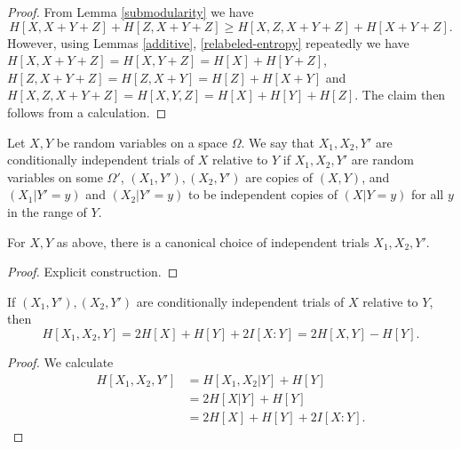 \begin{proof}
From Lemma \ref{submodularity} we have
$$ H[X, X+Y+Z] + H[Z, X+Y+Z] \geq H[X, Z, X+Y+Z] + H[X+Y+Z].$$
However, using Lemmas \ref{additive}, \ref{relabeled-entropy} repeatedly we have $H[X, X+Y+Z] = H[X, Y+Z] = H[X] + H[Y+Z]$, $H[Z, X+Y + Z] = H[Z, X+Y] = H[Z] + H[X+Y]$ and $H[X, Z, X+Y+Z] = H[X, Y, Z] = H[X] + H[Y] + H[Z]$.  The claim then follows from a calculation.
\end{proof}

\begin{definition}\label{cond-trial}  Let $X,Y$ be random variables on a space $\Omega$.
  We say that $X_1, X_2, Y'$ are conditionally independent trials of $X$ relative to $Y$ if $X_1,X_2,Y'$ are random variables on some $\Omega'$, $(X_1,Y'), (X_2,Y')$ are copies of $(X,Y)$, and $(X_1 | Y' = y)$ and $(X_2 | Y' = y)$ to be independent copies of $(X | Y = y)$ for all $y$ in the range of $Y$.
\end{definition}

\begin{lemma}\label{cond-indep-exist} For $X,Y$ as above, there is a canonical choice of independent trials $X_1,X_2,Y'$.
\end{lemma}

\begin{proof} Explicit construction.
\end{proof}

\begin{lemma}\label{cond-trial-ent}  If $(X_1,Y'), (X_2,Y')$ are conditionally
independent trials of $X$ relative to $Y$, then
$$ H[X_1,X_2,Y] = 2 H[X] + H[Y] + 2 I[X:Y] = 2 H[X,Y] - H[Y].$$
\end{lemma}

\begin{proof}  We calculate
  \begin{equation}
  \begin{split} H[X_1, X_2, Y'] &= H[X_1,X_2|Y] + H[Y] \\
    &= 2 H[X|Y] + H[Y] \\
    &= 2 H[X] + H[Y] + 2 I[X:Y].
  \end{split}  \end{equation}
\end{proof}


